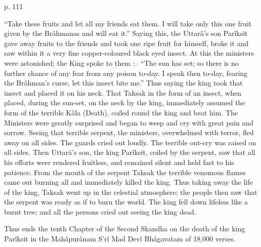  

p. 111

 

“Take these fruits and let all my friends eat them. I will take only this one fruit given by the Brâhmanas and will eat it.” Saying this, the Uttarâ's son Parîksit gave away fruits to the friends and took one ripe fruit for himself, broke it and saw within it a very fine copper-coloured black eyed insect. At this the ministers were astonished; the King spoke to them :-- “The sun has set; so there is no further chance of any fear from any poison to-day. I speak then to-day, fearing the Brâhman's curse, let this insect bite me.” Thus saying the king took that insect and placed it on his neck. That Taksak in the form of an insect, when placed, during the sun-set, on the neck by the king, immediately assumed the form of the terrible Kâla (Death), coiled round the king and beat him. The Ministers were greatly surprised and began to weep and cry with great pain and sorrow. Seeing that terrible serpent, the ministers, overwhelmed with terror, fled away on all sides. The guards cried out loudly. The terrible out-cry was raised on all sides. Then Uttarâ's son, the king Parîksit, coiled by the serpent, saw that all his efforts were rendered fruitless, and remained silent and held fast to his patience. From the mouth of the serpent Taksak the terrible venomous flames came out burning all and immediately killed the king. Thus taking away the life of the king, Taksak went up in the celestial atmosphere; the people then saw that the serpent was ready as if to burn the world. The king fell down lifeless like a burnt tree; and all the persons cried out seeing the king dead.

 

Thus ends the tenth Chapter of the Second Skandha on the death of the king Parîksit in the Mahâpurânam S'rî Mad Devî Bhâgavatam of 18,000 verses.